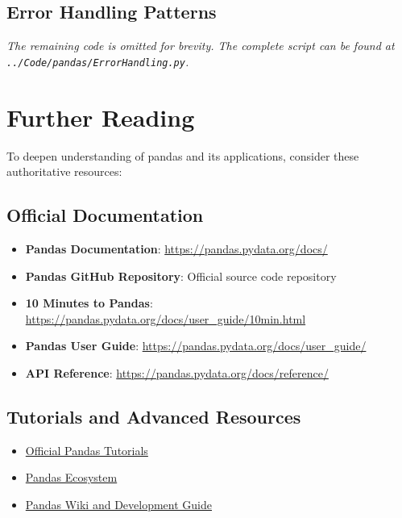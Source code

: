 \subsection{Error Handling Patterns}
\label{subsec:error_patterns}



\noindent\textit{The remaining code is omitted for brevity. The complete script can be found at \texttt{../Code/pandas/ErrorHandling.py}.}

\section{Further Reading}
\label{sec:further_reading}

To deepen understanding of pandas and its applications, consider these authoritative resources:

\subsection{Official Documentation}
\begin{itemize}
	\item \textbf{Pandas Documentation}: \url{https://pandas.pydata.org/docs/}
	\item \textbf{Pandas GitHub Repository}: Official source code repository \cite{Pandas:2024}
	\item \textbf{10 Minutes to Pandas}: \url{https://pandas.pydata.org/docs/user_guide/10min.html}
	\item \textbf{Pandas User Guide}: \url{https://pandas.pydata.org/docs/user_guide/}
	\item \textbf{API Reference}: \url{https://pandas.pydata.org/docs/reference/}
\end{itemize}

\subsection{Tutorials and Advanced Resources}
\begin{itemize}
	\item \href{https://pandas.pydata.org/docs/getting_started/tutorials.html}{Official Pandas Tutorials}
	\item \href{https://pandas.pydata.org/community/ecosystem.html}{Pandas Ecosystem}
	\item \href{https://github.com/pandas-dev/pandas/wiki}{Pandas Wiki and Development Guide} \cite{Pandas:Community:2023}
\end{itemize}

